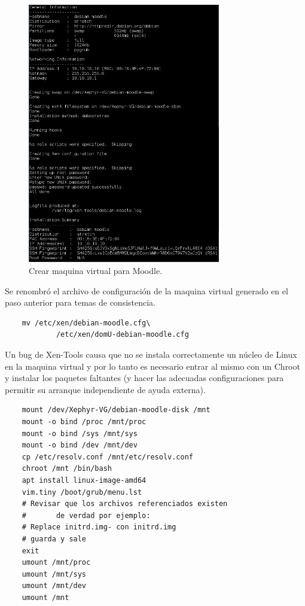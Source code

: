 \begin{figure}
	\begin{center}
    	\includegraphics[width=0.75\textwidth]{Figures/crear-moodle.png}
    \end{center}
  	\caption{Crear maquina virtual para Moodle.}
    \label{vm-moodle}
\end{figure}

Se renombró el archivo de configuración de la maquina virtual generado en el paso anterior para temas de consistencia.

\begin{lstlisting}
	mv /etc/xen/debian-moodle.cfg\
    		/etc/xen/domU-debian-moodle.cfg
\end{lstlisting}

Un bug de Xen-Tools causa que no se instala correctamente un núcleo de Linux en la maquina virtual y por lo tanto es necesario entrar al mismo con un Chroot y instalar los paquetes faltantes (y hacer las adecuadas configuraciones  para permitir su arranque independiente de ayuda externa).

\begin{lstlisting}
	mount /dev/Xephyr-VG/debian-moodle-disk /mnt
	mount -o bind /proc /mnt/proc
	mount -o bind /sys /mnt/sys
	mount -o bind /dev /mnt/dev
	cp /etc/resolv.conf /mnt/etc/resolv.conf
	chroot /mnt /bin/bash
	apt install linux-image-amd64
	vim.tiny /boot/grub/menu.lst
	# Revisar que los archivos referenciados existen
	#		de verdad por ejemplo:
	# Replace initrd.img- con initrd.img
    # guarda y sale
	exit
	umount /mnt/proc            
	umount /mnt/sys 
	umount /mnt/dev 
	umount /mnt	
\end{lstlisting}

